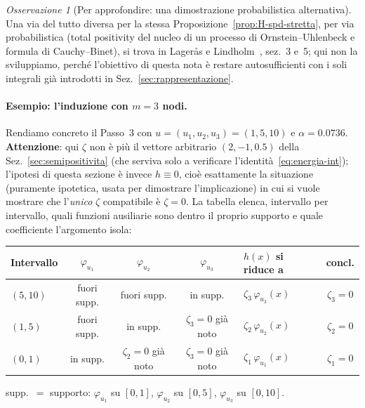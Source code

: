 \documentclass[11pt,a4paper]{article}
\theoremstyle{plain}
\theoremstyle{definition}
\theoremstyle{remark}
\newtheorem*{osservazione}{Osservazione}
\begin{document}
\begin{osservazione}[Per approfondire: una dimostrazione probabilistica alternativa]
Una via del tutto diversa per la stessa Proposizione~\ref{prop:H-spd-stretta}, per via
probabilistica (total positivity del nucleo di un processo di Ornstein--Uhlenbeck e formula di
Cauchy--Binet), si trova in Lager\aa s e Lindholm~\cite{lageras2016}, sez.~3 e~5; qui non la
sviluppiamo, perché l'obiettivo di questa nota è restare autosufficienti con i soli integrali
già introdotti in Sez.~\ref{sec:rappresentazione}.
\end{osservazione}

\paragraph{Esempio: l'induzione con $m=3$ nodi.} Rendiamo concreto il Passo~3 con
$u=(u_1,u_2,u_3)=(1,5,10)$ e $\alpha=0.0736$. \textbf{Attenzione}: qui $\zeta$ non è più il
vettore arbitrario $(2,-1,0.5)$ della Sez.~\ref{sec:semipositivita} (che serviva solo a
verificare l'identità~\eqref{eq:energia-int}); l'ipotesi di questa sezione è invece
$h\equiv 0$, cioè esattamente la situazione (puramente ipotetica, usata per dimostrare
l'implicazione) in cui si vuole mostrare che l'\emph{unico} $\zeta$ compatibile è $\zeta=0$.
La tabella elenca, intervallo per intervallo, quali funzioni ausiliarie sono dentro il proprio
supporto e quale coefficiente l'argomento isola:

\begin{center}
\small
\renewcommand{\arraystretch}{1.35}
\setlength{\tabcolsep}{4.5pt}
\begin{tabular}{lccclc}
\toprule
\textbf{Intervallo} & $\varphi_{u_1}$ & $\varphi_{u_2}$ & $\varphi_{u_3}$
  & \textbf{$h(x)$ si riduce a} & \textbf{concl.}\\
\midrule
$(5,10)$ & fuori supp. & fuori supp. & in supp.
  & $\zeta_3\,\varphi_{u_3}(x)$ & $\zeta_3=0$\\
$(1,5)$ & fuori supp. & in supp. & $\zeta_3=0$ già noto
  & $\zeta_2\,\varphi_{u_2}(x)$ & $\zeta_2=0$\\
$(0,1)$ & in supp. & $\zeta_2=0$ già noto & $\zeta_3=0$ già noto
  & $\zeta_1\,\varphi_{u_1}(x)$ & $\zeta_1=0$\\
\bottomrule
\end{tabular}

\smallskip
{\footnotesize supp.\ $=$ supporto: $\varphi_{u_1}$ su $[0,1]$, $\varphi_{u_2}$ su $[0,5]$,
$\varphi_{u_3}$ su $[0,10]$.}
\end{center}
\end{document}

